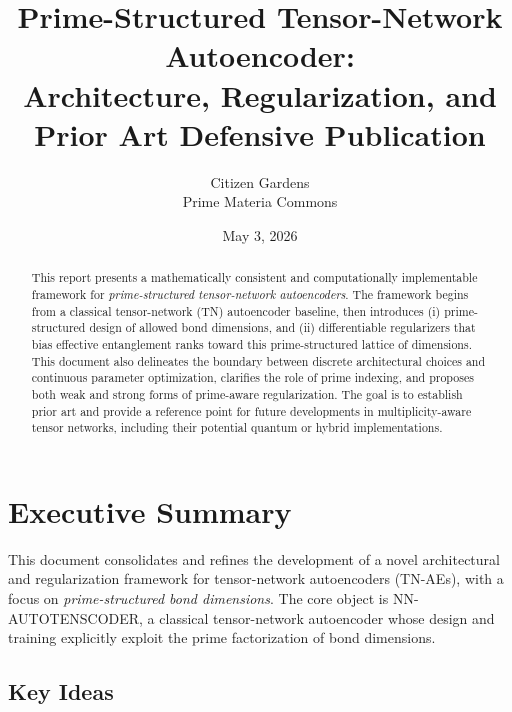 \documentclass[11pt]{article}
\title{Prime-Structured Tensor-Network Autoencoder:\\
Architecture, Regularization, and Prior Art Defensive Publication}
\author{Citizen Gardens \\ Prime Materia Commons}
\date{May 3, 2026}
\begin{document}
\maketitle

\begin{abstract}
This report presents a mathematically consistent and computationally implementable framework for \emph{prime-structured tensor-network autoencoders}. The framework begins from a classical tensor-network (TN) autoencoder baseline, then introduces (i) prime-structured design of allowed bond dimensions, and (ii) differentiable regularizers that bias effective entanglement ranks toward this prime-structured lattice of dimensions. This document also delineates the boundary between discrete architectural choices and continuous parameter optimization, clarifies the role of prime indexing, and proposes both weak and strong forms of prime-aware regularization. The goal is to establish prior art and provide a reference point for future developments in multiplicity-aware tensor networks, including their potential quantum or hybrid implementations.
\end{abstract}

\tableofcontents
\newpage
\section{Executive Summary}

This document consolidates and refines the development of a novel architectural and regularization framework for tensor-network autoencoders (TN-AEs), with a focus on \emph{prime-structured bond dimensions}. The core object is NN-AUTOTENSCODER, a classical tensor-network autoencoder whose design and training explicitly exploit the prime factorization of bond dimensions.

\subsection{Key Ideas}
\end{document}
